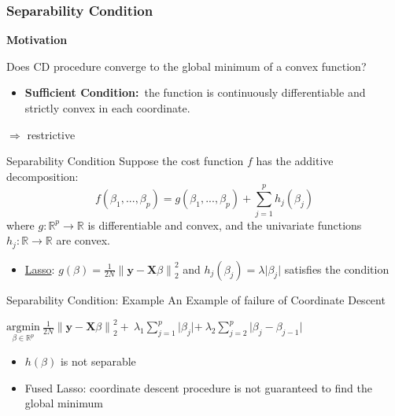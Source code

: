 \documentclass[handout]{beamer}
\begin{document}
\begin{frame}
\frametitle{Separability Condition}
\textbf{Motivation} 
\vspace*{6mm}
\begin{block}{Does CD procedure converge to the global minimum of a convex function? }
\vspace*{3mm}
 {
\begin{itemize}
    \item \textbf{Sufficient Condition:}\  the function is continuously differentiable and strictly convex in each coordinate. 
\end{itemize}
$\Rightarrow$  restrictive 

}

\end{block}
    
\end{frame}

\begin{frame}{Separability Condition}
Suppose the cost function \(f\) has the additive decomposition:
\begin{equation*}
    f(\beta_1,...,\beta_p)=g(\beta_1,...,\beta_p)+\displaystyle\sum_{j=1}^{p} h_j(\beta_j)
\end{equation*}
where \(g:\mathbb{R}^p \rightarrow \mathbb{R}\) is differentiable and convex, and the univariate functions  \(h_j:\mathbb{R} \rightarrow \mathbb{R}\) are convex. 
\vspace*{6mm}
\begin{itemize}
    \item \underline{Lasso}: \(g(\beta)=\frac{1}{2N}{\lVert\textbf{y}-\textbf{X}\beta\rVert}^2_2 \) and \(h_j(\beta_j)=\lambda\lvert\beta_j\lvert\) satisfies the condition
\end{itemize}
    
\end{frame}


\begin{frame}{Separability Condition: Example}
An Example of failure of Coordinate Descent 


\vspace*{6mm}
\(\underset{\beta\in\mathbb{R}^p}{\mathrm{argmin}}\ \frac{1}{2N}{\lVert\textbf{y}-\textbf{X}\beta\rVert}^2_2 + \ \lambda_{1}\sum_{j=1}^{p}\lvert\beta_j\lvert+\ \lambda_{2}\sum_{j=2}^{p}\lvert\beta_j-\beta_{j-1}\lvert\)

\vspace*{6mm}
\begin{itemize}
    \item \(h(\beta)\) is not separable
\end{itemize}
\begin{itemize}
    \item Fused Lasso: coordinate descent procedure is not guaranteed to find the global minimum
\end{itemize}


    
\end{frame}
\end{document}
